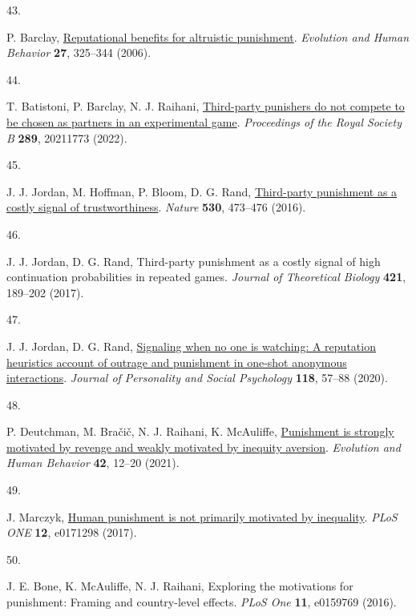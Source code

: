 \documentclass[
  man, donotrepeattitle,floatsintext]{apa6}
\newlength{\cslhangindent}
\newlength{\csllabelwidth}
\newlength{\cslentryspacingunit} %
\newenvironment{CSLReferences}[2] %
 {%
  \setlength{\parindent}{0pt}
  \ifodd #1
  \let\oldpar\par
  \def\par{\hangindent=\cslhangindent\oldpar}
  \fi
  \setlength{\parskip}{#2\cslentryspacingunit}
 }%
 {}
\newcommand{\CSLLeftMargin}[1]{\parbox[t]{\csllabelwidth}{#1}}
\newcommand{\CSLRightInline}[1]{\parbox[t]{\linewidth - \csllabelwidth}{#1}\break}
\begin{document}
\begin{CSLReferences}{0}{0}
\leavevmode{}%
\CSLLeftMargin{43. }%
\CSLRightInline{P. Barclay, \href{https://doi.org/10.1016/j.evolhumbehav.2006.01.003}{Reputational benefits for altruistic punishment}. \emph{Evolution and Human Behavior} \textbf{27}, 325--344 (2006).}

\leavevmode{}%
\CSLLeftMargin{44. }%
\CSLRightInline{T. Batistoni, P. Barclay, N. J. Raihani, \href{https://doi.org/10.1098/rspb.2021.1773}{Third-party punishers do not compete to be chosen as partners in an experimental game}. \emph{Proceedings of the Royal Society B} \textbf{289}, 20211773 (2022).}

\leavevmode{}%
\CSLLeftMargin{45. }%
\CSLRightInline{J. J. Jordan, M. Hoffman, P. Bloom, D. G. Rand, \href{https://doi.org/10.1038/nature16981}{Third-party punishment as a costly signal of trustworthiness}. \emph{Nature} \textbf{530}, 473--476 (2016).}

\leavevmode{}%
\CSLLeftMargin{46. }%
\CSLRightInline{J. J. Jordan, D. G. Rand, Third-party punishment as a costly signal of high continuation probabilities in repeated games. \emph{Journal of Theoretical Biology} \textbf{421}, 189--202 (2017).}

\leavevmode{}%
\CSLLeftMargin{47. }%
\CSLRightInline{J. J. Jordan, D. G. Rand, \href{https://doi.org/10.1037/pspi0000186}{Signaling when no one is watching: A reputation heuristics account of outrage and punishment in one-shot anonymous interactions}. \emph{Journal of Personality and Social Psychology} \textbf{118}, 57--88 (2020).}

\leavevmode{}%
\CSLLeftMargin{48. }%
\CSLRightInline{P. Deutchman, M. Bračič, N. J. Raihani, K. McAuliffe, \href{https://doi.org/10.1016/j.evolhumbehav.2020.06.001}{Punishment is strongly motivated by revenge and weakly motivated by inequity aversion}. \emph{Evolution and Human Behavior} \textbf{42}, 12--20 (2021).}

\leavevmode{}%
\CSLLeftMargin{49. }%
\CSLRightInline{J. Marczyk, \href{https://doi.org/10.1371/journal.pone.0171298}{Human punishment is not primarily motivated by inequality}. \emph{PLoS ONE} \textbf{12}, e0171298 (2017).}

\leavevmode{}%
\CSLLeftMargin{50. }%
\CSLRightInline{J. E. Bone, K. McAuliffe, N. J. Raihani, Exploring the motivations for punishment: Framing and country-level effects. \emph{PLoS One} \textbf{11}, e0159769 (2016).}


\end{CSLReferences}
\end{document}
